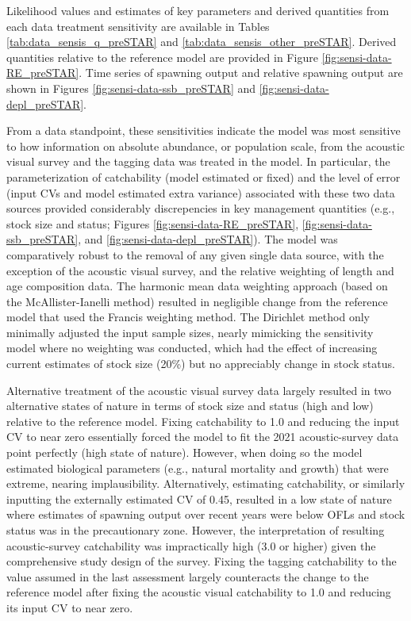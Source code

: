 \documentclass[11pt,
  letterpaper,
]{article}
\begin{document}
Likelihood values and estimates of key parameters and derived quantities from each data treatment sensitivity are available in Tables \ref{tab:data_sensis_q_preSTAR} and \ref{tab:data_sensis_other_preSTAR}. Derived quantities relative to the reference model are provided in Figure \ref{fig:sensi-data-RE_preSTAR}. Time series of spawning output and relative spawning output are shown in Figures \ref{fig:sensi-data-ssb_preSTAR} and \ref{fig:sensi-data-depl_preSTAR}.

From a data standpoint, these sensitivities indicate the model was most sensitive to how information on absolute abundance, or population scale, from the acoustic visual survey and the tagging data was treated in the model. In particular, the parameterization of catchability (model estimated or fixed) and the level of error (input CVs and model estimated extra variance) associated with these two data sources provided considerably discrepencies in key management quantities (e.g., stock size and status; Figures \ref{fig:sensi-data-RE_preSTAR}, \ref{fig:sensi-data-ssb_preSTAR}, and \ref{fig:sensi-data-depl_preSTAR}). The model was comparatively robust to the removal of any given single data source, with the exception of the acoustic visual survey, and the relative weighting of length and age composition data. The harmonic mean data weighting approach (based on the McAllister-Ianelli method) resulted in negligible change from the reference model that used the Francis weighting method. The Dirichlet method only minimally adjusted the input sample sizes, nearly mimicking the sensitivity model where no weighting was conducted, which had the effect of increasing current estimates of stock size (20\%) but no appreciably change in stock status.

Alternative treatment of the acoustic visual survey data largely resulted in two alternative states of nature in terms of stock size and status (high and low) relative to the reference model. Fixing catchability to 1.0 and reducing the input CV to near zero essentially forced the model to fit the 2021 acoustic-survey data point perfectly (high state of nature). However, when doing so the model estimated biological parameters (e.g., natural mortality and growth) that were extreme, nearing implausibility. Alternatively, estimating catchability, or similarly inputting the externally estimated CV of 0.45, resulted in a low state of nature where estimates of spawning output over recent years were below OFLs and stock status was in the precautionary zone. However, the interpretation of resulting acoustic-survey catchability was impractically high (3.0 or higher) given the comprehensive study design of the survey. Fixing the tagging catchability to the value assumed in the last assessment largely counteracts the change to the reference model after fixing the acoustic visual catchability to 1.0 and reducing its input CV to near zero.
\end{document}
